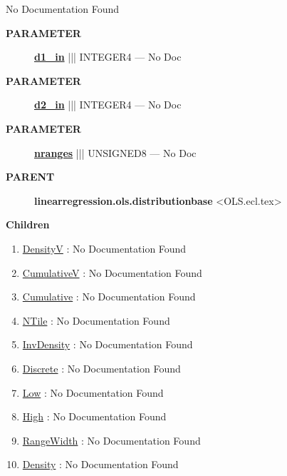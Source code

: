 \par





No Documentation Found






\par
\begin{description}
\item [\colorbox{tagtype}{\color{white} \textbf{\textsf{PARAMETER}}}] \textbf{\underline{d1\_in}} ||| INTEGER4 --- No Doc
\item [\colorbox{tagtype}{\color{white} \textbf{\textsf{PARAMETER}}}] \textbf{\underline{d2\_in}} ||| INTEGER4 --- No Doc
\item [\colorbox{tagtype}{\color{white} \textbf{\textsf{PARAMETER}}}] \textbf{\underline{nranges}} ||| UNSIGNED8 --- No Doc
\end{description}









\par
\begin{description}
\item [\colorbox{tagtype}{\color{white} \textbf{\textsf{PARENT}}}] \textbf{linearregression.ols.distributionbase} <OLS.ecl.tex>
\end{description}


\textbf{Children}
\begin{enumerate}
\item \hyperlink{ecldoc:linearregression.ols.distributionbase.densityv}{DensityV}
: No Documentation Found
\item \hyperlink{ecldoc:linearregression.ols.distributionbase.cumulativev}{CumulativeV}
: No Documentation Found
\item \hyperlink{ecldoc:linearregression.ols.distributionbase.cumulative}{Cumulative}
: No Documentation Found
\item \hyperlink{ecldoc:linearregression.ols.distributionbase.ntile}{NTile}
: No Documentation Found
\item \hyperlink{ecldoc:linearregression.ols.distributionbase.invdensity}{InvDensity}
: No Documentation Found
\item \hyperlink{ecldoc:linearregression.ols.distributionbase.discrete}{Discrete}
: No Documentation Found
\item \hyperlink{ecldoc:linearregression.ols.fdistribution.low}{Low}
: No Documentation Found
\item \hyperlink{ecldoc:linearregression.ols.fdistribution.high}{High}
: No Documentation Found
\item \hyperlink{ecldoc:linearregression.ols.fdistribution.rangewidth}{RangeWidth}
: No Documentation Found
\item \hyperlink{ecldoc:linearregression.ols.fdistribution.density}{Density}
: No Documentation Found
\end{enumerate}

